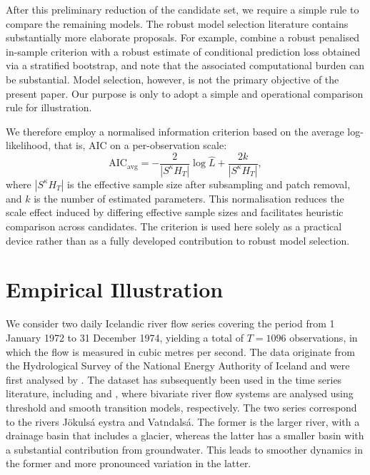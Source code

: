 \documentclass[12pt]{article}
\numberwithin{equation}{section}
\begin{document}
After this preliminary reduction of the candidate set, we require a simple rule to compare the remaining models. 
The robust model selection literature contains substantially more elaborate proposals. 
For example, \citet{Müller01122005} combine a robust penalised in-sample criterion with a robust estimate of conditional prediction loss obtained via a stratified bootstrap, and note that the associated computational burden can be substantial. 
Model selection, however, is not the primary objective of the present paper. 
Our purpose is only to adopt a simple and operational comparison rule for illustration.

We therefore employ a normalised information criterion based on the average log-likelihood, that is, AIC on a per-observation scale:
\begin{equation}\label{eqn:aic_avg}
\mathrm{AIC}_{\mathrm{avg}}
=
-\frac{2}{|S^\kappa H_T|}\log \hat L
+
\frac{2k}{|S^\kappa H_T|},
\end{equation}
where $|S^\kappa H_T|$ is the effective sample size after subsampling and patch removal, and $k$ is the number of estimated parameters. 
This normalisation reduces the scale effect induced by differing effective sample sizes and facilitates heuristic comparison across candidates. 
The criterion is used here solely as a practical device rather than as a fully developed contribution to robust model selection.


\section{Empirical Illustration}\label{sec:illustration}

We consider two daily Icelandic river flow series covering the period from 1 January 1972 to 31 December 1974, yielding a total of $T=1096$ observations, in which the flow is measured in cubic metres per second. The data originate from the Hydrological Survey of the National Energy Authority of Iceland and were first analysed by \citet{ToThGu85}. The dataset has subsequently been used in the time series literature, including \citet{Tsa98} and \citet{TeYa14}, where bivariate river flow systems are analysed using threshold and smooth transition models, respectively.
The two series correspond to the rivers Jökulsá eystra and Vatndalsá. The former is the larger river, with a drainage basin that includes a glacier, whereas the latter has a smaller basin with a substantial contribution from groundwater. This leads to smoother dynamics in the former and more pronounced variation in the latter.
\end{document}
